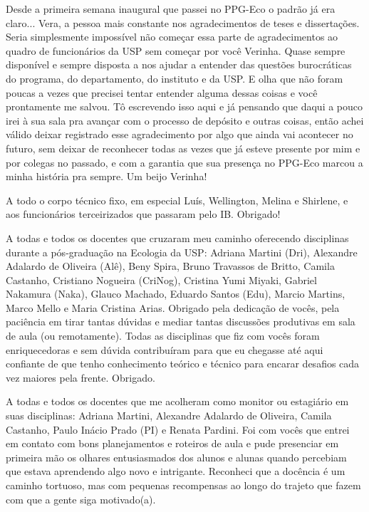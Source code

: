 \documentclass[12pt,openright,oneside,a4paper,english]{abntex2}
\begin{document}
\begin{agradecimentos}[Agradecimentos]
Desde a primeira semana inaugural que passei no PPG-Eco o padrão já era claro... Vera, a pessoa mais constante nos agradecimentos de teses e dissertações. Seria simplesmente impossível não começar essa parte de agradecimentos ao quadro de funcionários da USP sem começar por você Verinha. Quase sempre disponível e sempre disposta a nos ajudar a entender das questões burocráticas do programa, do departamento, do instituto e da USP. E olha que não foram poucas a vezes que precisei tentar entender alguma dessas coisas e você prontamente me salvou. Tô escrevendo isso aqui e já pensando que daqui a pouco irei à sua sala pra avançar com o processo de depósito e outras coisas, então achei válido deixar registrado esse agradecimento por algo que ainda vai acontecer no futuro, sem deixar de reconhecer todas as vezes que já esteve presente por mim e por colegas no passado, e com a garantia que sua presença no PPG-Eco marcou a minha história pra sempre. Um beijo Verinha!

A todo o corpo técnico fixo, em especial Luís, Wellington, Melina e Shirlene, e aos funcionários terceirizados que passaram pelo IB. Obrigado!

A todas e todos os docentes que cruzaram meu caminho oferecendo disciplinas durante a pós-graduação na Ecologia da USP: Adriana Martini (Dri), Alexandre Adalardo de Oliveira (Alê), Beny Spira, Bruno Travassos de Britto, Camila Castanho, Cristiano Nogueira (CriNog), Cristina Yumi Miyaki, Gabriel Nakamura (Naka), Glauco Machado, Eduardo Santos (Edu), Marcio Martins, Marco Mello e Maria Cristina Arias. Obrigado pela dedicação de vocês, pela paciência em tirar tantas dúvidas e mediar tantas discussões produtivas em sala de aula (ou remotamente). Todas as disciplinas que fiz com vocês foram enriquecedoras e sem dúvida contribuíram para que eu chegasse até aqui confiante de que tenho conhecimento teórico e técnico para encarar desafios cada vez maiores pela frente. Obrigado.

A todas e todos os docentes que me acolheram como monitor ou estagiário em suas disciplinas: Adriana Martini, Alexandre Adalardo de Oliveira, Camila Castanho, Paulo Inácio Prado (PI) e Renata Pardini. Foi com vocês que entrei em contato com bons planejamentos e roteiros de aula e pude presenciar em primeira mão os olhares entusiasmados dos alunos e alunas quando percebiam que estava aprendendo algo novo e intrigante. Reconheci que a docência é um caminho tortuoso, mas com pequenas recompensas ao longo do trajeto que fazem com que a gente siga motivado(a).


\end{agradecimentos}
\end{document}
